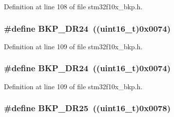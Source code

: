 Definition at line 108 of file stm32f10x\+\_\+bkp.\+h.

\subsubsection[{\texorpdfstring{B\+K\+P\+\_\+\+D\+R24}{BKP_DR24}}]{\setlength{\rightskip}{0pt plus 5cm}\#define B\+K\+P\+\_\+\+D\+R24~(({\bf uint16\+\_\+t})0x0074)}\hypertarget{group___data___backup___register_ga7fa403483a916fa56826a5f7f79551e4}{}\label{group___data___backup___register_ga7fa403483a916fa56826a5f7f79551e4}


Definition at line 109 of file stm32f10x\+\_\+bkp.\+h.

\subsubsection[{\texorpdfstring{B\+K\+P\+\_\+\+D\+R24}{BKP_DR24}}]{\setlength{\rightskip}{0pt plus 5cm}\#define B\+K\+P\+\_\+\+D\+R24~(({\bf uint16\+\_\+t})0x0074)}\hypertarget{group___data___backup___register_ga7fa403483a916fa56826a5f7f79551e4}{}\label{group___data___backup___register_ga7fa403483a916fa56826a5f7f79551e4}


Definition at line 109 of file stm32f10x\+\_\+bkp.\+h.

\subsubsection[{\texorpdfstring{B\+K\+P\+\_\+\+D\+R25}{BKP_DR25}}]{\setlength{\rightskip}{0pt plus 5cm}\#define B\+K\+P\+\_\+\+D\+R25~(({\bf uint16\+\_\+t})0x0078)}\hypertarget{group___data___backup___register_ga99c4f81f642716e6b4544284d938ee9f}{}\label{group___data___backup___register_ga99c4f81f642716e6b4544284d938ee9f}


